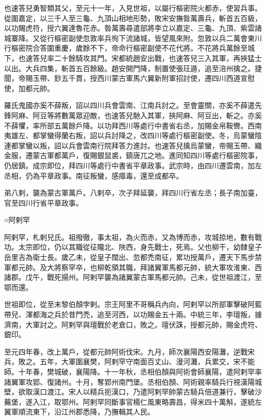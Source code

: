 \begin{pinyinscope}
 也速答兒勇智類其父，至元十一年，入見世祖，以屬行樞密院火都赤，使習兵事。從圍嘉定，以三千人至三龜、九頂山相地形勢，敗宋安撫昝萬壽兵，斬首五百級，以功賜虎符，授六翼達魯花赤。昝萬壽尋遣部將李立以嘉定、三龜、九頂、紫雲諸城寨降。又從行樞密副使忽敦率兵徇下流諸城，皆望風來附。忽敦以兵二萬會東川行樞密院合答圍重慶，歲餘不下，帝命行樞密副使不花代將。不花將兵萬餘至城下，也速答兒率二十餘騎攻其門。宋都統趙安出戰，也速答兒三入其軍，再挾猛士以出。大兵四集，斬首五百餘級。趙安開門降，制置使張玨遁，追至涪州擒之。捷聞，帝賜玉帶、鈔五千貫，授西川蒙古軍馬六翼新附軍招討使，遷四川西道宣慰使，加都元帥。



 羅氏鬼國亦奚不薛叛，詔以四川兵會雲南、江南兵討之。至會靈關，亦奚不薛遣先鋒阿麻、阿豆等將數萬眾迎敵，也速答兒馳入其軍，挾阿麻、阿豆出，斬之。亦奚不薛懼，率所部五萬餘戶降。以功拜西川等處行中書省右丞，加賜金帛鞍轡。西南夷雄左、都掌蠻得蘭右叛，詔以兵討降之，改四川等處行樞密副使。冬，烏蒙蠻陰連都掌蠻以叛，詔以兵會雲南行院拜答力進討。也速答兒擒烏蒙蠻，帝賜玉帶、織金服，遷蒙古軍都萬戶，復賜銀鼠裘，鎮唐兀之地。進同知四川等處行樞密院事，仍居鎮。成宗即位，拜四川等處行中書省平章政事。武宗時，由四川遷雲南，加左丞相，仍為平章政事。南征叛蠻，感瘴毒，還至成都卒。



 弟八剌，襲為蒙古軍萬戶。八剌卒，次子拜延襲，拜四川行省左丞；長子南加臺，官至四川行省平章政事。



 ○阿剌罕



 阿剌罕，札剌兒氏。祖撥徹，事太祖，為火而赤，又為博而赤，攻城掠地，數有戰功。太宗即位，仍以其職從征隴北、陜西，身先戰士，死焉。父也柳干，幼隸皇子岳里吉為衛士長。歲乙未，從皇子闊出、忽都禿南征，累功授萬戶，遷天下馬步禁軍都元帥。及大將察罕卒，也柳乾領其職，拜諸翼軍馬都元帥，統大軍攻淮東、西諸郡。戊午，戰死揚州。阿剌罕襲為諸翼蒙古軍馬都元帥。己未，從世祖渡江，至鄂而還。



 世祖即位，從至末黎伯顏孛剌。宗王阿里不哥稱兵內向，阿剌罕以所部軍擊破阿藍帶兒、渾都海之兵於昔門禿，追至河西，以功賜金五十兩。中統三年，李璮叛，據濟南，大軍討之。阿剌罕與璮戰於老倉口，敗之。璮伏誅，授都元帥，賜金虎符、銀印。



 至元四年春，改上萬戶，從都元帥阿術伐宋。九月，師次襄陽西安陽灘，逆戰宋兵，敗之。五年，大軍圍襄樊，阿剌罕守南面百丈山、漫河灘，兵累交，宋不能師。十年春，樊城破，襄陽降。十一年秋，丞相伯顏與阿術會師襄陽，遣阿剌罕率諸翼軍攻郢、復諸州。十月，奪郢州南門堡。丞相伯顏、阿術親率騎兵行視漢陽城壁，欲取漢口渡江。宋人以精兵扼漢口，乃遣阿剌罕帥蒙古騎兵倍道兼行，擊破沙蕪堡，遂入江，取鄂州。阿剌罕同斷事官楊仁風東略壽昌，得米四十萬斛，遂統左翼軍順流東下，沿江州郡悉降，乃撫輯其人民。




\end{pinyinscope}
